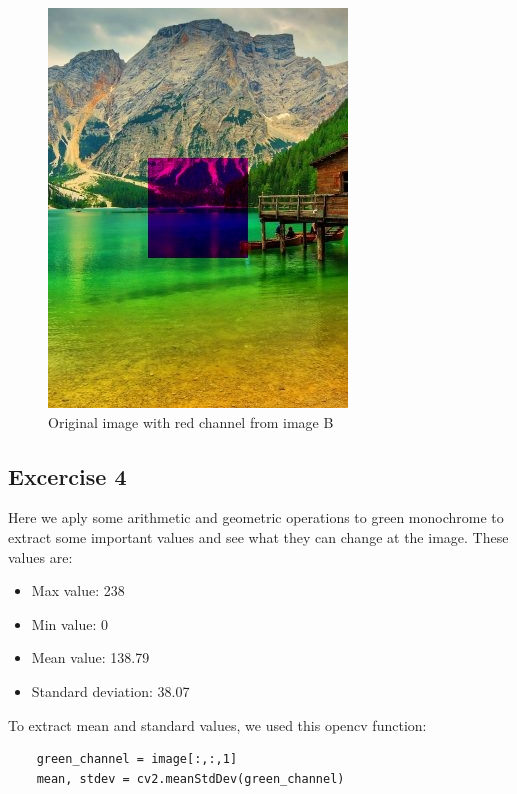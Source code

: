 \documentclass[]{IEEEtran}
\begin{document}
  \begin{figure}[!h]
    \centering
    \includegraphics[width=0.8\hsize]{../output/o-3-1.jpg}
    \caption{Original image with red channel from image B}
    \label{fig:o-3-1}
  \end{figure}

\subsection{Excercise 4}
  Here we aply some arithmetic and geometric operations to green monochrome to extract some important values and see what they can change at the image.
  These values are:
  \begin{itemize}
    \item{Max value: 238}
    \item{Min value: 0}
    \item{Mean value: 138.79}
    \item{Standard deviation: 38.07}
  \end{itemize}


  To extract mean and standard values, we used this opencv function:
  \begin{lstlisting}     
    green_channel = image[:,:,1]
    mean, stdev = cv2.meanStdDev(green_channel)
  \end{lstlisting}  
\end{document}
